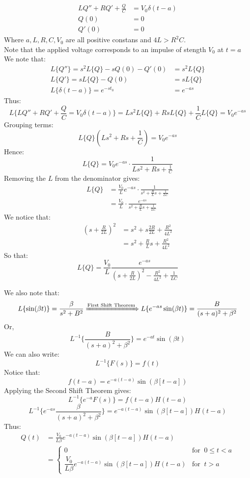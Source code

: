 \documentclass[a4paper, 10pt]{article}
\begin{document}
\begin{examplebox}
  \begin{align*}
    LQ'' + RQ' + \frac{Q}{C} &= V_0 \delta(t-a) \\
    Q(0) &= 0 \\ 
    Q'(0) &= 0
  \end{align*}
  Where $a,L,R,C,V_0$ are all positive constans and $4L > R^2C$. \\
  Note that the applied voltage corresponds to an impulse of stength $V_0$ at $t=a$ \\ 
  We note that:
  \begin{align*}
    L\{Q''\} = s^2 L\{Q\} - sQ(0) - Q'(0) &= s^2 L\{Q\} \\
    L\{Q'\} = sL\{Q\} - Q(0) &= sL\{Q\} \\
    L\{\delta(t-a)\} = e^{-st_0} &= e^{-as} 
  \end{align*}
  Thus:
  $$L\{LQ'' + RQ' + \frac{Q}{C} = V_0 \delta(t-a)\} = Ls^2L\{Q\} + RsL\{Q\} + \frac{1}{C}L\{Q\} = V_0 e^{-as}$$
  Grouping terms:
  $$L\{Q\}(Ls^2 + Rs + \frac{1}{C}) = V_0 e^{-as}$$
  Hence:
  $$L\{Q\} = V_0 e^{-as} \cdot \frac{1}{Ls^2 + Rs + \frac{1}{C}}$$
  Removing the $L$ from the denominator gives:
  \begin{align*}
  L\{Q\} &= \frac{V_0}{L}e^{-as} \cdot \frac{1}{s^2 + \frac{R}{L}s + \frac{1}{LC}} \\
  &=\frac{V_0}{L}\cdot \frac{e^{-as}}{s^2 + \frac{R}{L}s + \frac{1}{LC}}
  \end{align*}
  We notice that:
  \begin{align*}
    (s+\frac{R}{2L})^2 &= s^2 + s \frac{2R}{2L} + \frac{R^2}{4L^2} \\
    &= s^2 + \frac{R}{L}s + \frac{R^2}{4L^2}
  \end{align*}
  So that:
  $$L\{Q\} = \frac{V_0}{L} \frac{e^{-as}}{(s+\frac{R}{2L})^2 - \frac{R^2}{4L^2} + \frac{1}{LC}}$$
  
  We also note that:
  $$L\{\sin(\beta t)\} = \frac{\beta}{s^2 + B^2} \xRightarrow{\text{First Shift Theorem}} L\{e^{-as} \sin(\beta t)\} = \frac{B}{(s+a)^2 + \beta^2}$$
  Or, 
  $$L^{-1} \{\frac{B}{(s+a)^2 + \beta^2}\} = e^{-at}\sin(\beta t)$$
  We can also write:
  $$L^{-1}\{F(s)\} = f(t)$$
  Notice that:
  $$f(t-a) = e^{-a(t-a)} \sin(\beta [t-a])$$
  Applying the Second Shift Theorem gives:
  $$L^{-1}\{e^{-a} F(s)\} = f(t-a)H(t-a)$$
  $$L^{-1} \{e^{-as}\frac{\beta}{(s+a)^2 + \beta^2}\} = e^{-a(t-a)}\sin(\beta[t-a])H(t-a)$$
  Thus:
  \begin{align*}
  Q(t) &= \frac{V_0}{L\beta} e^{-a(t-a)}\sin(\beta[t-a])H(t-a) \\
  &= \begin{cases}
    0 &\text{for}\;\; 0 \leq t < a  \\
    \dfrac{V_0}{L\beta} e^{-a(t-a)}\sin(\beta[t-a])H(t-a) &\text{for}\;\; t > a
  \end{cases}
  \end{align*}
\end{examplebox}
\end{document}
